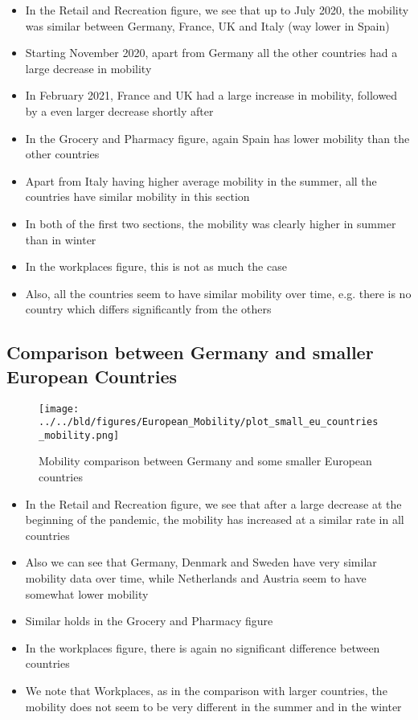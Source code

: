 \documentclass[11pt, a4paper, leqno]{article}
\begin{document}
\begin{itemize}
	\item In the Retail and Recreation figure, we see that up to July 2020, the mobility was similar between Germany, France, UK and Italy (way lower in Spain)
	\item Starting November 2020, apart from Germany all the other countries had a large decrease in mobility
	\item In February 2021, France and UK had a large increase in mobility, followed by a even larger decrease shortly after
	\item In the Grocery and Pharmacy figure, again Spain has lower mobility than the other countries
	\item Apart from Italy having higher average mobility in the summer, all the countries have similar mobility in this section
	\item In both of the first two sections, the mobility was clearly higher in summer than in winter
	\item In the workplaces figure, this is not as much the case
	\item Also, all the countries seem to have similar mobility over time, e.g. there is no country which differs significantly from the others
\end{itemize}

\newpage
\subsection{Comparison between Germany and smaller European Countries}
\begin{figure}
	\centering
	\caption{Mobility comparison between Germany and some smaller European countries}
	\texttt{[image: ../../bld/figures/European\_Mobility/plot\_small\_eu\_countries\_mobility.png]}
\end{figure}

\begin{itemize}
	\item In the Retail and Recreation figure, we see that after a large decrease at the beginning of the pandemic, the mobility has increased at a similar rate in all countries
	\item Also we can see that Germany, Denmark and Sweden have very similar mobility data over time, while Netherlands and Austria seem to have somewhat lower mobility
	\item Similar holds in the Grocery and Pharmacy figure
	\item In the workplaces figure, there is again no significant difference between countries
	\item We note that Workplaces, as in the comparison with larger countries, the mobility does not seem to be very different in the summer and in the winter
\end{itemize}
\end{document}
